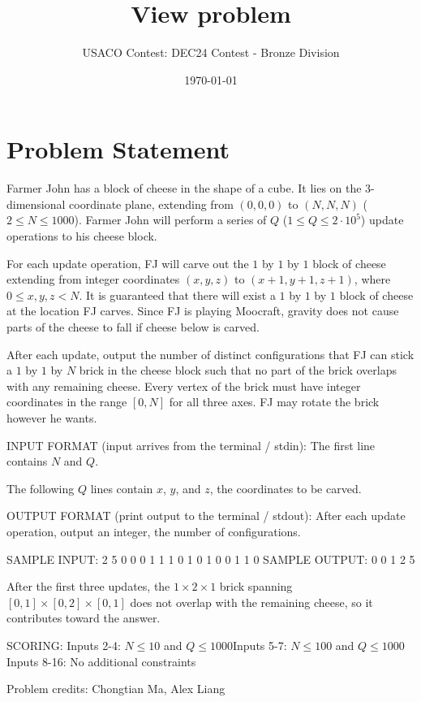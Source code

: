 \documentclass[12pt]{article}
\title{View problem}
\author{USACO Contest: DEC24 Contest - Bronze Division}
\date{\today}
\begin{document}
\maketitle

\section*{Problem Statement}


Farmer John has a block of cheese in the shape of a cube. It lies on the
3-dimensional coordinate plane, extending from $(0,0,0)$ to $(N, N, N)$
($2 \leq N \leq 1000$). Farmer John will perform a series of $Q$
($1 \leq Q \leq 2 \cdot 10^5$) update operations to his cheese block.

For each update operation, FJ will carve out the $1$ by $1$ by $1$ block of
cheese extending from integer coordinates $(x, y, z)$ to $(x+1, y+1, z+1)$,
where $0\le x,y,z<N$. It is guaranteed that there will exist a $1$ by $1$ by $1$
block of cheese at the location FJ carves.  Since FJ is playing Moocraft,
gravity does not cause parts of the cheese to fall if cheese below is carved.

After each update, output the number of distinct configurations that FJ can
stick a $1$ by $1$ by $N$ brick in the cheese block such that no part of the
brick overlaps with any remaining cheese. Every vertex of the brick must have
integer coordinates in the range $[0,N]$ for all three axes. FJ may rotate the
brick however he wants.

INPUT FORMAT (input arrives from the terminal / stdin):
The first line contains $N$ and $Q$.

The following $Q$ lines contain $x$, $y$, and $z$, the coordinates to be carved.

OUTPUT FORMAT (print output to the terminal / stdout):
After each update operation, output an integer, the number of configurations.


SAMPLE INPUT:
2 5
0 0 0
1 1 1
0 1 0
1 0 0
1 1 0
SAMPLE OUTPUT: 
0
0
1
2
5

After the first three updates, the $1\times 2 \times 1$ brick spanning 
$[0, 1]\times [0, 2]\times [0, 1]$ does not overlap with the remaining cheese,
so it contributes toward the answer.


SCORING:
Inputs 2-4: $N\le 10$ and $Q \le 1000$Inputs 5-7:
$N\le 100$ and $Q \le 1000$Inputs 8-16: No additional
constraints


Problem credits: Chongtian Ma, Alex Liang
\end{document}
